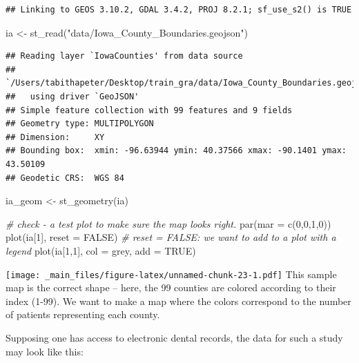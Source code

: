 \documentclass[
]{book}
\newenvironment{Shaded}{\begin{snugshade}}{\end{snugshade}}
\newcommand{\AttributeTok}[1]{\textcolor[rgb]{0.77,0.63,0.00}{#1}}
\newcommand{\CommentTok}[1]{\textcolor[rgb]{0.56,0.35,0.01}{\textit{#1}}}
\newcommand{\ConstantTok}[1]{\textcolor[rgb]{0.00,0.00,0.00}{#1}}
\newcommand{\DecValTok}[1]{\textcolor[rgb]{0.00,0.00,0.81}{#1}}
\newcommand{\FunctionTok}[1]{\textcolor[rgb]{0.00,0.00,0.00}{#1}}
\newcommand{\NormalTok}[1]{#1}
\newcommand{\OtherTok}[1]{\textcolor[rgb]{0.56,0.35,0.01}{#1}}
\newcommand{\StringTok}[1]{\textcolor[rgb]{0.31,0.60,0.02}{#1}}
\begin{document}
\begin{verbatim}
## Linking to GEOS 3.10.2, GDAL 3.4.2, PROJ 8.2.1; sf_use_s2() is TRUE
\end{verbatim}

\begin{Shaded}
\begin{Highlighting}[]
\NormalTok{ia }\OtherTok{\textless{}{-}} \FunctionTok{st\_read}\NormalTok{(}\StringTok{"data/Iowa\_County\_Boundaries.geojson"}\NormalTok{)}
\end{Highlighting}
\end{Shaded}

\begin{verbatim}
## Reading layer `IowaCounties' from data source 
##   `/Users/tabithapeter/Desktop/train_gra/data/Iowa_County_Boundaries.geojson' 
##   using driver `GeoJSON'
## Simple feature collection with 99 features and 9 fields
## Geometry type: MULTIPOLYGON
## Dimension:     XY
## Bounding box:  xmin: -96.63944 ymin: 40.37566 xmax: -90.1401 ymax: 43.50109
## Geodetic CRS:  WGS 84
\end{verbatim}

\begin{Shaded}
\begin{Highlighting}[]
\NormalTok{ia\_geom }\OtherTok{\textless{}{-}} \FunctionTok{st\_geometry}\NormalTok{(ia)}


\CommentTok{\# check {-} a test plot to make sure the map looks right. }
\FunctionTok{par}\NormalTok{(}\AttributeTok{mar =} \FunctionTok{c}\NormalTok{(}\DecValTok{0}\NormalTok{,}\DecValTok{0}\NormalTok{,}\DecValTok{1}\NormalTok{,}\DecValTok{0}\NormalTok{))}
\FunctionTok{plot}\NormalTok{(ia[}\DecValTok{1}\NormalTok{], }\AttributeTok{reset =} \ConstantTok{FALSE}\NormalTok{) }\CommentTok{\# reset = FALSE: we want to add to a plot with a legend}
\FunctionTok{plot}\NormalTok{(ia[}\DecValTok{1}\NormalTok{,}\DecValTok{1}\NormalTok{], }\AttributeTok{col =} \StringTok{\textquotesingle{}grey\textquotesingle{}}\NormalTok{, }\AttributeTok{add =} \ConstantTok{TRUE}\NormalTok{)}
\end{Highlighting}
\end{Shaded}

\texttt{[image: \_main\_files/figure-latex/unnamed-chunk-23-1.pdf]}
This sample map is the correct shape -- here, the 99 counties are colored according to their index (1-99). We want to make a map where the colors correspond to the number of patients representing each county.

Supposing one has access to electronic dental records, the data for such a study may look like this:
\end{document}
